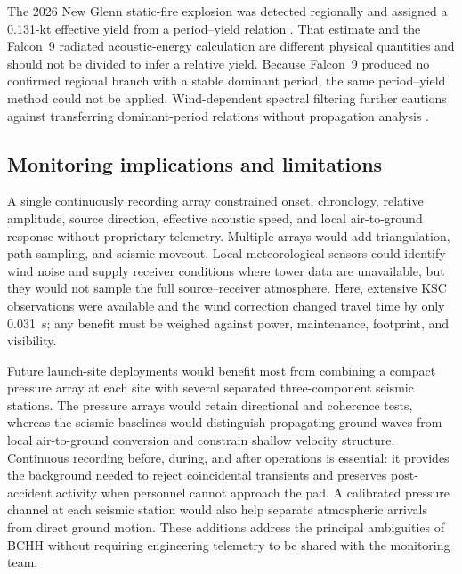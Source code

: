 \documentclass[]{seismica}
\begin{document}
The 2026 New Glenn static-fire explosion was detected regionally and assigned
a 0.131-kt effective yield from a period--yield relation
\citep{silber_scamfer_newglenn_2026}. That estimate and the Falcon~9 radiated
acoustic-energy calculation are different physical quantities and should not
be divided to infer a relative yield. Because Falcon~9 produced no confirmed
regional branch with a stable dominant period, the same period--yield method
could not be applied. Wind-dependent spectral filtering further cautions
against transferring dominant-period relations without propagation analysis
\citep{silber_wind_filtering_2026}.

\subsection{Monitoring implications and limitations}

A single continuously recording array constrained onset, chronology, relative
amplitude, source direction, effective acoustic speed, and local air-to-ground
response without proprietary telemetry. Multiple arrays would add
triangulation, path sampling, and seismic moveout. Local meteorological sensors
could identify wind noise and supply receiver conditions where tower data are
unavailable, but they would not sample the full source--receiver atmosphere.
Here, extensive KSC observations were available and the wind correction changed
travel time by only 0.031~s; any benefit must be weighed against power,
maintenance, footprint, and visibility.

Future launch-site deployments would benefit most from combining a compact
pressure array at each site with several separated three-component seismic
stations. The pressure arrays would retain directional and coherence tests,
whereas the seismic baselines would distinguish propagating ground waves from
local air-to-ground conversion and constrain shallow velocity structure.
Continuous recording before, during, and after operations is essential: it
provides the background needed to reject coincidental transients and preserves
post-accident activity when personnel cannot approach the pad. A calibrated
pressure channel at each seismic station would also help separate atmospheric
arrivals from direct ground motion. These additions address the principal
ambiguities of BCHH without requiring engineering telemetry to be shared with
the monitoring team.
\end{document}

